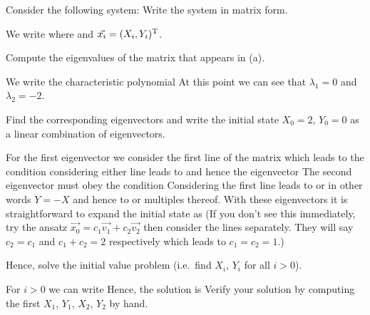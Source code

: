 Consider the following system: 
\subquestion Write the system in matrix form.

\solution
We write
where 
and $\vec{x_i}=(X_i,Y_i)^{\rm T}$. 

\subquestion
Compute the eigenvalues of the matrix that appears in (a).

\solution
We write the characteristic polynomial 
At this point we can see that $\lambda_1=0$ and $\lambda_2=-2$. 

\subquestion 
Find the corresponding eigenvectors and write the initial state $X_0=2$, $Y_0=0$ as a linear combination of eigenvectors. 

\solution
For the first eigenvector we consider the first line of the matrix which leads 
to the condition 
considering either line leads to 
and hence the eigenvector
The second eigenvector must obey the condition
Considering the first line leads to 
or in other words $Y=-X$ and hence to
or multiples thereof. With these eigenvectors it is straightforward to expand the initial state as
(If you don't see this immediately, try the ansatz $\vec{x_0}=c_1 \vec{v_1}+c_2 \vec{v_2}$ then consider the lines separately. They will say $c_2=c_1$ and $c_1+c_2=2$ respectively which leads to $c_1=c_2=1$.)

\subquestion
Hence, solve the initial value problem (i.e.~find $X_i$, $Y_i$ for all $i>0$).

\solution
For $i>0$ we can write 
Hence, the solution is 
\subquestion 
Verify your solution by computing the first $X_1$, $Y_1$, $X_2$, $Y_2$ by hand.

